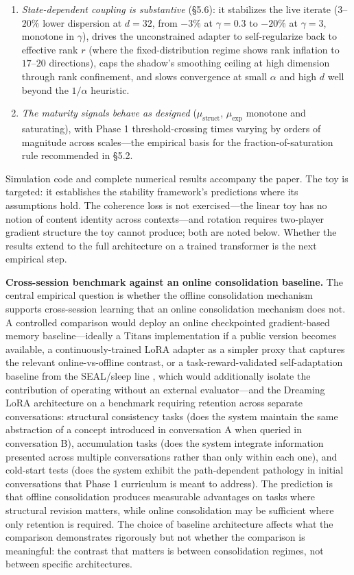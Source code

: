 \documentclass[11pt]{article}
\begin{document}
\begin{enumerate}[nosep]
    \item \emph{State-dependent coupling is substantive} (\S 5.6): it stabilizes the live iterate ($3$--$20\%$ lower dispersion at $d = 32$, from $-3\%$ at $\gamma = 0.3$ to $-20\%$ at $\gamma = 3$, monotone in $\gamma$), drives the unconstrained adapter to self-regularize back to effective rank $r$ (where the fixed-distribution regime shows rank inflation to $17$--$20$ directions), caps the shadow's smoothing ceiling at high dimension through rank confinement, and slows convergence at small $\alpha$ and high $d$ well beyond the $1/\alpha$ heuristic.
    \item \emph{The maturity signals behave as designed} ($\mu_\text{struct}$, $\mu_\text{exp}$ monotone and saturating), with Phase 1 threshold-crossing times varying by orders of magnitude across scales---the empirical basis for the fraction-of-saturation rule recommended in \S 5.2.
\end{enumerate}

Simulation code and complete numerical results accompany the paper. The toy is targeted: it establishes the stability framework's predictions where its assumptions hold. The coherence loss is not exercised---the linear toy has no notion of content identity across contexts---and rotation requires two-player gradient structure the toy cannot produce; both are noted below. Whether the results extend to the full architecture on a trained transformer is the next empirical step.

\textbf{Cross-session benchmark against an online consolidation baseline.} The central empirical question is whether the offline consolidation mechanism supports cross-session learning that an online consolidation mechanism does not. A controlled comparison would deploy an online checkpointed gradient-based memory baseline---ideally a Titans implementation if a public version becomes available, a continuously-trained LoRA adapter as a simpler proxy that captures the relevant online-vs-offline contrast, or a task-reward-validated self-adaptation baseline from the SEAL/sleep line \cite{zweiger2025seal, anonymous2026sleep}, which would additionally isolate the contribution of operating without an external evaluator---and the Dreaming LoRA architecture on a benchmark requiring retention across separate conversations: structural consistency tasks (does the system maintain the same abstraction of a concept introduced in conversation A when queried in conversation B), accumulation tasks (does the system integrate information presented across multiple conversations rather than only within each one), and cold-start tests (does the system exhibit the path-dependent pathology in initial conversations that Phase 1 curriculum is meant to address). The prediction is that offline consolidation produces measurable advantages on tasks where structural revision matters, while online consolidation may be sufficient where only retention is required. The choice of baseline architecture affects what the comparison demonstrates rigorously but not whether the comparison is meaningful: the contrast that matters is between consolidation regimes, not between specific architectures.
\end{document}
